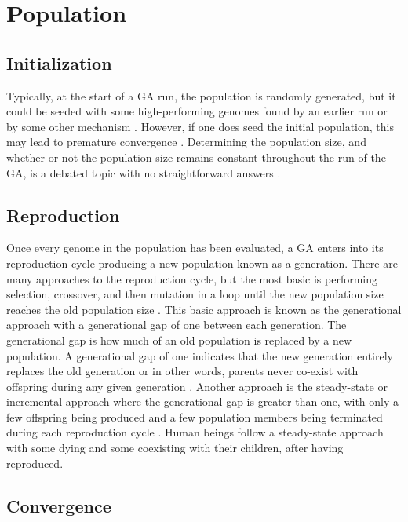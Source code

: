 \section{Population}

\subsection{Initialization}

Typically, at the start of a GA run, the population is randomly generated, but it could be seeded with some high-performing genomes found by an earlier run or by some other mechanism \cite{DBLP:conf/gem/Diaz-GomezH07}\cite{ColinReeves}. However, if one does seed the initial population, this may lead to premature convergence \cite{ColinReeves}. Determining the population size, and whether or not the population size remains constant throughout the run of the GA, is a debated topic with no straightforward answers \cite{ColinReeves}.     

\subsection{Reproduction}

Once every genome in the population has been evaluated, a GA enters into its reproduction cycle producing a new population known as a generation. There are many approaches to the reproduction cycle, but the most basic is performing selection, crossover, and then mutation in a loop until the new population size reaches the old population size \cite{Beasley93anoverview}. This basic approach is known as the generational approach with a generational gap of one between each generation. The generational gap is how much of an old population is replaced by a new population. A generational gap of one indicates that the new generation entirely replaces the old generation or in other words, parents never co-exist with offspring during any given generation \cite{Beasley93anoverview}. Another approach is the steady-state or incremental approach where the generational gap is greater than one, with only a few offspring being produced and a few population members being terminated during each reproduction cycle \cite{ColinReeves}. Human beings follow a steady-state approach with some dying and some coexisting with their children, after having reproduced.

\subsection{Convergence}

